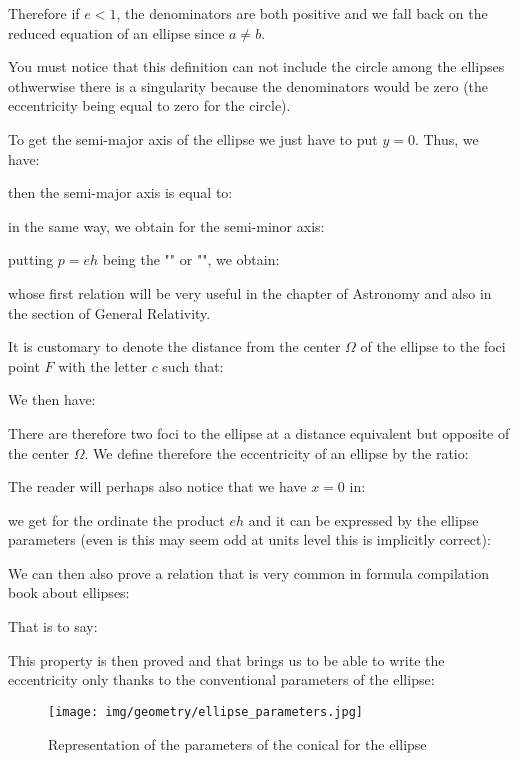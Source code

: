 \begin{enumerate}
		Therefore if $e<1$, the denominators are both positive and we fall back on the reduced equation of an ellipse since $a\neq b$.
		\begin{tcolorbox}[title=Remark,colframe=black,arc=10pt]
		You must notice that this definition can not include the circle among the ellipses othwerwise there is a singularity because the denominators would be zero (the eccentricity being equal to zero for the circle).
		\end{tcolorbox}
		To get the semi-major axis of the ellipse we just have to put $y=0$. Thus, we have:
		
		then the semi-major axis is equal to:
		
		in the same way, we obtain for the semi-minor axis:
		
		putting $p=eh$ being the "" or "", we obtain:
		
		whose first relation will be very useful in the chapter of Astronomy and also in the section of General Relativity.
		
		It is customary to denote the distance from the center $\Omega$ of the ellipse to the foci point $F$ with the letter $c$ such that:
		
		We then have:
		
		There are therefore two foci to the ellipse at a distance equivalent but opposite of the center $\Omega$. We define therefore the eccentricity of an ellipse by the ratio:
		
		The reader will perhaps also notice that we have $x = 0$ in:
		
		we get for the ordinate the product $eh$ and it can be expressed by the ellipse parameters (even is this may seem odd at units level this is implicitly correct):
		
		We can then also prove a relation that is very common in formula compilation book about ellipses:
		
		That is to say:
		
		This property is then proved and that brings us to be able to write the eccentricity only thanks to the conventional parameters of the ellipse:
		
		\begin{figure}[H]
			\centering
			\texttt{[image: img/geometry/ellipse\_parameters.jpg]}
			\caption{Representation of the parameters of the conical for the ellipse}
		\end{figure}
		

\end{enumerate}
